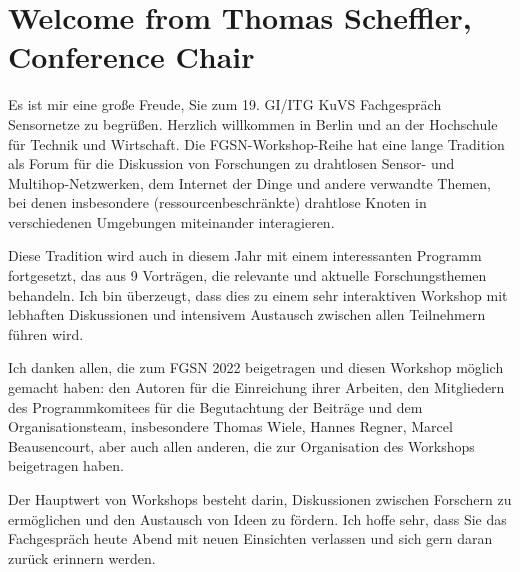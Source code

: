 \documentclass[a4paper,%
  10pt,%
  oneside,%
  onesidepapers,%
  electronic,%
  binding=0mm,%
  papers=countpages,%
  headers=allpages,%
  bib=backref,%
  paperselec=all,%
  onecoltoc,%
  tocnum=right,%
  twocolbib,%
  twocolindex,%
  checktitle=false,%
  checkauthor=false,%
  showpapernumber=false,%
  movepagenumber=true,%
  showmarginlines=false,%
  colorheaders=black,%
  debug=false,%
  verbose=false,%
  pdftk=false,%
  geometry={text={175truemm,226truemm},%
    inner=0.69in,top=23.9mm,bottom=38mm,footskip=10.4mm,voffset=-2.8mm},%
  ]{confproc_22}
\begin{document}
\section*{Welcome from Thomas Scheffler, Conference Chair}
\vspace*{0.8cm}
\onehalfspace
\begin{center}
  \begin{minipage}[h]{14cm}
    Es ist mir eine große Freude, Sie zum 19. GI/ITG KuVS Fachgespräch Sensornetze zu begrüßen.
Herzlich willkommen in Berlin und an der Hochschule für Technik und Wirtschaft.
Die FGSN-Workshop-Reihe hat eine lange Tradition als Forum für die Diskussion von Forschungen zu drahtlosen Sensor- und Multihop-Netzwerken, dem Internet der Dinge und andere verwandte Themen, bei denen insbesondere (ressourcenbeschränkte) drahtlose Knoten in verschiedenen Umgebungen miteinander interagieren. 

Diese Tradition wird auch in diesem Jahr mit einem interessanten Programm fortgesetzt, das aus 9 Vorträgen, die relevante und aktuelle Forschungsthemen behandeln. 
Ich bin überzeugt, dass dies zu einem sehr interaktiven Workshop mit lebhaften Diskussionen und intensivem Austausch zwischen allen Teilnehmern führen wird.

Ich danken allen, die zum FGSN 2022 beigetragen und diesen Workshop möglich gemacht haben: den Autoren für die Einreichung ihrer Arbeiten, den Mitgliedern des Programmkomitees für die Begutachtung der Beiträge und dem Organisationsteam, insbesondere Thomas Wiele, Hannes Regner, Marcel Beausencourt, aber auch allen anderen, die zur Organisation des Workshops beigetragen haben.

Der Hauptwert von Workshops besteht darin, Diskussionen zwischen Forschern zu ermöglichen und den Austausch von Ideen zu fördern.
Ich hoffe sehr, dass Sie das Fachgespräch heute Abend mit neuen Einsichten verlassen und sich gern daran zurück erinnern werden.
  \end{minipage}
\end{center}
\singlespace
\vspace*{0.6cm}
\thisotherpagestyle
{}
\end{document}
